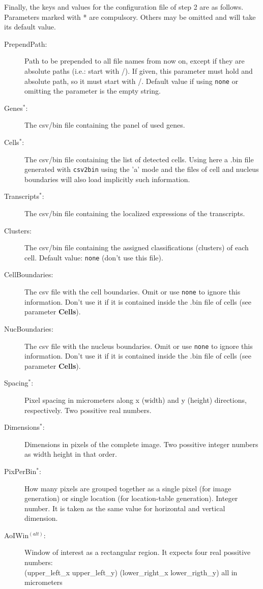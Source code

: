 \documentclass[11pt]{report}
\begin{document}
Finally, the keys and values for the configuration file of step 2 are as follows. Parameters marked with * are compulsory.
Others may be omitted and will take its default value.
\begin{description}
\item[PrependPath:] Path to be prepended to all file names from now on, except if they are absolute paths (i.e.: start with /).
If given, this parameter must hold and absolute path, so it must start with /. Default value if using {\tt none} or omitting the parameter
is the empty string.
\item[Genes$^*$:] The csv/bin file containing the panel of used genes. 
\item[Cells$^*$:] The csv/bin file containing the list of detected cells. Using here a .bin file generated with {\tt csv2bin} using the 'a' mode and
the files of cell and nucleus boundaries will also load implicitly such information.
\item[Transcripts$^*$:] The csv/bin file containing the localized expressions of the transcripts.
\item[Clusters:] The csv/bin file containing the assigned classifications (clusters) of each cell. Default value: {\tt none} (don't use this file).
\item[CellBoundaries:] The csv file with the cell boundaries. Omit or use {\tt none} to ignore this information. Don't use it if it is contained
inside the .bin file of cells (see parameter {\bf Cells}).
\item[NucBoundaries:] The csv file with the nucleus boundaries. Omit or use {\tt none} to ignore this information. Don't use it if it is contained
inside the .bin file of cells (see parameter {\bf Cells}).
\item[Spacing$^*$:] Pixel spacing in micrometers along x (width) and y (height) directions, respectively. Two possitive real numbers.
\item[Dimensions$^*$:] Dimensions in pixels of the complete image. Two possitive integer numbers as width height in that order.
\item[PixPerBin$^*$:] How many pixels are grouped together as a single pixel (for image generation) or single location (for location-table generation).
Integer number. It is taken as the same value for horizontal and vertical dimension.
\item[AoIWin$^{(alt)}$:] Window of interest as a rectangular region. It expects four real possitive numbers:\\
(upper\_left\_x upper\_left\_y) (lower\_right\_x lower\_rigth\_y) all in micrometers

\end{description}
\end{document}
